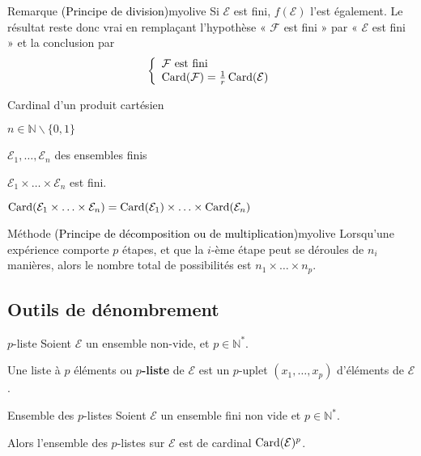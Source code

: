     \begin{omed}{Remarque \textcolor{black}{(Principe de division)}}{myolive}
        Si $\mathcal{E}$ est fini, $f(\mathcal{E})$ l’est également. Le résultat reste donc vrai en remplaçant l’hypothèse « $\mathcal{F}$ est fini » par « $\mathcal{E}$ est fini » et la conclusion par \[ \et{\mathcal{F} \text{ est fini}}{\card(\mathcal{F}) =  \frac{1}{r} \card(\mathcal{E})} \]
    \end{omed}

    \begin{prop}{Cardinal d’un produit cartésien}{}
        \begin{soient}
            \item $n \in \mathbb{N} \backslash \{ 0,1 \}$
            \item $\mathcal{E}_1,\ldots,\mathcal{E}_n$ des ensembles finis
        \end{soient}
        \begin{alors}
            \item $\mathcal{E}_1 \times \ldots \times \mathcal{E}_n$ est fini.
            \item $\operatorname{Card}(\mathcal{E}_1 \times \ldots \times \mathcal{E}_n) = \operatorname{Card}(\mathcal{E}_1) \times \ldots \times \operatorname{Card}(\mathcal{E}_n)$
        \end{alors}
    \end{prop}

    \begin{omed}{Méthode \textcolor{black}{(Principe de décomposition ou de multiplication)}}{myolive}
        Lorsqu’une expérience comporte $p$ étapes, et que la $i$-ème étape peut se déroules de $n_i$ manières, alors le nombre total de possibilités est $n_1 \times \ldots \times n_p$.
    \end{omed}

    \subsection{Outils de dénombrement}

    \begin{defi}{$p$-liste}{}
        Soient $\mathcal{E}$ un ensemble non-vide, et $p \in \mathbb{N}^*$.

        Une liste à $p$ éléments ou \textbf{$p$-liste} de $\mathcal{E}$ est un $p$-uplet $(x_1,\ldots,x_p)$ d’éléments de $\mathcal{E}$.
    \end{defi}

    \begin{theo}{Ensemble des $p$-listes}{}
        Soient $\mathcal{E}$ un ensemble fini non vide et $p \in \mathbb{N}^*$.
    
        Alors l’ensemble des $p$-listes sur $\mathcal{E}$ est de cardinal $\operatorname{Card}(\mathcal{E})^p$.
    \end{theo}

